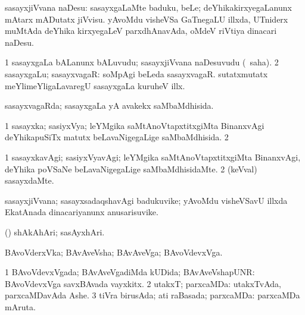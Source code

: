 \bentry
{} 
\gl{\akirx}
\expl{}
\bmng
 sasayxjiVvana naDesu: 
\banum
{} sasayxgaLaMte baduku, beLe; deYhikakirxyegaLanunx mAtarx mADutatx jiVvisu. 
 yAvoMdu visheVSa GaTnegaLU illxda, UTniderx muMtAda deYhika kirxyegaLeV parxdhAnavAda, oMdeV riVtiya dinacari naDesu. 
\eanum
\emng
\eentry

\bentry
{} 
\gl{\nA}
\expl{}
\bmng
\bnum
\num{1} sasayxgaLa bALanunx bALuvudu; sasayxjiVvana naDesuvudu (\rUpa\ saha). 
\num{2} sasayxgaLu; sasayxvagaR:  soMpAgi beLeda sasayxvagaR.  sutatxmutatx meYlimeYligaLavaregU sasayxgaLa kuruheV illx. 
\enum
\emng
\eentry

\bentry
{} 
\gl{\gu}
\expl{}
\bmng
 sasayxvagaRda; sasayxgaLa yA avakekx saMbaMdhisida. 
\emng
\eentry

\bentry
{} 
\gl{\gu}
\expl{}
\bmng
\bnum
\num{1} sasayxka; sasiyxVya; leYMgika saMtAnoVtapxtitxgiMta BinanxvAgi deYhikapuSiTx matutx beLavaNigegaLige saMbaMdhisida. 
\num{2}  
\enum
\emng
\eentry

\bentry
{} 
\gl{\kirxvi}
\expl{}
\bmng
\bnum
\num{1} sasayxkavAgi; sasiyxVyavAgi; leYMgika saMtAnoVtapxtitxgiMta BinanxvAgi, deYhika poVSaNe beLavaNigegaLige saMbaMdhisidaMte. 
\num{2} (keVval) sasayxdaMte. 
\enum
\emng
\eentry

\bentry
{} 
\gl{\nA}
\expl{}
\bmng
 sasayxjiVvana; sasayxsadaqshavAgi badukuvike; yAvoMdu visheVSavU illxda EkatAnada dinacariyanunx anusarisuvike. 
\emng
\eentry

\bentry
{} 
\gl{\nA}
\expl{}
\bmng
\emng
\eentry

\bentry
{} 
\gl{\nA}
\expl{}
\bmng
 (\AmA) shAkAhAri; sasAyxhAri. 
\emng
\eentry

\bentry
{} 
\gl{\nA}
\expl{}
\bmng
 BAvoVderxVka; BAvAveVsha; BAvAveVga; BAvoVdevxVga. 
\emng
\eentry

\bentry
{} 
\gl{\gu}
\expl{}
\bmng
\bnum
\num{1} BAvoVdevxVgada; BAvAveVgadiMda kUDida; BAvAveVshapUNR:  BAvoVdevxVga savxBAvada vayxkitx. 
\num{2} utakxT; parxcaMDa:  utakxTvAda, parxcaMDavAda Ashe. 
\num{3} tiVra birusAda; ati raBasada; parxcaMDa:  parxcaMDa mAruta. 
\enum
\emng
\eentry

